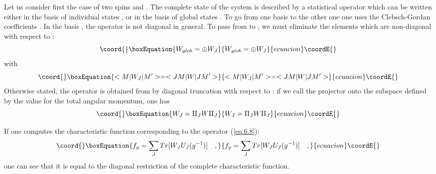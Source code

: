 \documentclass[a4paper,11pt]{article}
\begin{document}
Let us consider first the case of two spins \coordHE{} and \coordHE{}. The complete state of the system 
is 
described by a statistical operator \coordHE{} which can be written either in the basis of individual 
states \coordHE{}, or in the basis of global states \coordHE{}. To go from one basis to the other 
one 
one uses the Clebsch-Gordan coefficients \coordHE{}. In the basis \coordHE{}, the operator \coordHE{} 
is not diagonal in general. To pass from \coordHE{} to \coordHE{}, we must eliminate the elements 
which are non-diagonal with respect to \coordHE{} :
\begin{equation}\coord{}\boxEquation{
 \label{eq.6.8}
    W_{glob} = \oplus W_J
}{
 W_{glob} = \oplus W_J
}{ecuacion}\coordE{}\end{equation}
with
\begin{equation}\coord{}\boxEquation{
 \label{eq.6.9}
   <M | W_J | M'> = <JM | W | JM'>
}{
 <M | W_J | M'> = <JM | W | JM'>
}{ecuacion}\coordE{}\end{equation}
Otherwise stated, the operator \coordHE{} is obtained from \coordHE{} by diagonal truncation with 
respect to 
\coordHE{} : if we call \coordHE{} the projector onto the subspace defined by the value \coordHE{} for the total 
angular momentum, one has
\begin{equation}\coord{}\boxEquation{
 \label{eq.6.10}
    W_J = \Pi_J W \Pi_J
}{
 W_J = \Pi_J W \Pi_J
}{ecuacion}\coordE{}\end{equation}

If one computes the characteristic function \coordHE{} corresponding to the operator (\ref{eq.6.8}):
\begin{equation}\coord{}\boxEquation{
 \label{eq.6.11}
   f_g = \sum_J Tr [W_J U_J(g^{-1}) ] \quad ,
}{
 f_g = \sum_J Tr [W_J U_J(g^{-1}) ] \quad ,
}{ecuacion}\coordE{}\end{equation}
one can see that it is equal to the diagonal restriction of the complete characteristic function. 
\end{document}
